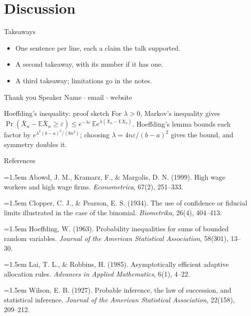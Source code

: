 \documentclass[10pt,aspectratio=169]{beamer}
\newcommand{\E}{\mathbb{E}}
\newcommand{\bibent}[1]{\par\hangindent=1.5em\hangafter=1 #1\par\smallskip}
\begin{document}
\section{Discussion}

\begin{frame}{Takeaways}
\begin{itemize}
  \item One sentence per line, each a claim the talk supported.
  \item A second takeaway, with its number if it has one.
  \item A third takeaway; limitations go in the notes.
\end{itemize}
\end{frame}

\begin{frame}{Thank you}
\centering
Speaker Name $\cdot$ email $\cdot$ website
\end{frame}

\appendix

\begin{frame}{Hoeffding's inequality: proof sketch}
For $\lambda > 0$, Markov's inequality gives $\Pr(\bar X_n - \E\bar X_n \ge \varepsilon) \le e^{-\lambda\varepsilon}\,\E e^{\lambda(\bar X_n - \E\bar X_n)}$. Hoeffding's lemma bounds each factor by $e^{\lambda^2(b-a)^2/(8n^2)}$; choosing $\lambda = 4n\varepsilon/(b-a)^2$ gives the bound, and symmetry doubles it.
\end{frame}

\begin{frame}{References}
\scriptsize
\setlength{\parindent}{0pt}
\bibent{Abowd, J. M., Kramarz, F., \& Margolis, D. N. (1999). High wage workers and high wage firms. \emph{Econometrica}, 67(2), 251--333.}
\bibent{Clopper, C. J., \& Pearson, E. S. (1934). The use of confidence or fiducial limits illustrated in the case of the binomial. \emph{Biometrika}, 26(4), 404--413.}
\bibent{Hoeffding, W. (1963). Probability inequalities for sums of bounded random variables. \emph{Journal of the American Statistical Association}, 58(301), 13--30.}
\bibent{Lai, T. L., \& Robbins, H. (1985). Asymptotically efficient adaptive allocation rules. \emph{Advances in Applied Mathematics}, 6(1), 4--22.}
\bibent{Wilson, E. B. (1927). Probable inference, the law of succession, and statistical inference. \emph{Journal of the American Statistical Association}, 22(158), 209--212.}
\end{frame}
\end{document}
